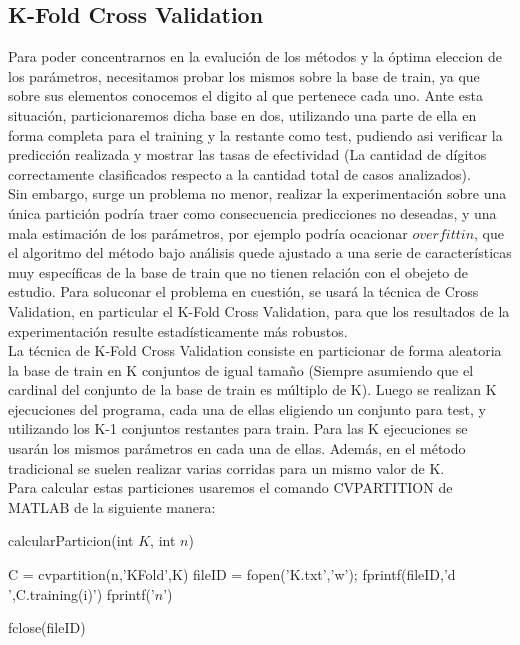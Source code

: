 \subsection{K-Fold Cross Validation}
Para poder concentrarnos en la evalución de los métodos y la óptima eleccion de los parámetros, necesitamos probar los mismos sobre la base de train, ya que sobre sus elementos conocemos el digito al que pertenece cada uno. Ante esta situación, particionaremos dicha base en dos, utilizando una parte de ella en forma completa para el training y la restante como test, pudiendo asi verificar la predicción realizada y mostrar las tasas de efectividad (La cantidad de dígitos correctamente clasificados respecto a la cantidad total de casos analizados).\\
Sin embargo, surge un problema no menor, realizar la experimentación sobre una única partición podría traer como consecuencia predicciones no deseadas, y una mala estimación de los parámetros, por ejemplo podría ocacionar $overfittin$, que el algoritmo del método bajo análisis quede ajustado a una serie de características muy específicas de la base de train que no tienen relación con el obejeto de estudio. Para soluconar el problema en cuestión, se usará la técnica de Cross Validation, en particular el K-Fold Cross Validation, para que los resultados de la experimentación resulte estadísticamente más robustos.\\
La técnica de K-Fold Cross Validation consiste en particionar de forma aleatoria la base de train en K conjuntos de igual tamaño (Siempre asumiendo que el cardinal del conjunto de la base de train es múltiplo de K).
Luego se realizan K ejecuciones del programa, cada una de ellas eligiendo un conjunto para test, y utilizando los K-1 conjuntos restantes para train. Para las K ejecuciones se usarán los mismos parámetros en cada una de ellas. Además, en el método tradicional se suelen realizar varias corridas para un mismo valor de K.\\
Para calcular estas particiones usaremos el comando CVPARTITION de MATLAB de la siguiente manera:\\
\begin{algorithm}[H]
\caption{calcularParticion(int $K$, int $n$)}
\begin{algorithmic}[1]
\State C = cvpartition(n,'KFold',K)
\State fileID = fopen('K.txt','w');
	\State fprintf(fileID,'d ',C.training(i)')
	\State fprintf('$n$')
\EndFor

\State fclose(fileID)

\end{algorithmic}
\end{algorithm}

